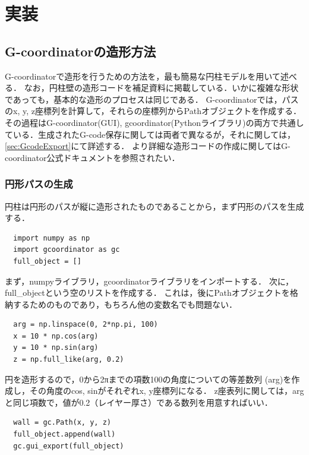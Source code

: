 \documentclass{article}
\begin{document}
\begin{twocolumn}
\begin{itemize}
\end{itemize}


\section{実装}
\subsection{G-coordinatorの造形方法}
G-coordinatorで造形を行うための方法を，最も簡易な円柱モデルを用いて述べる．
なお，円柱壁の造形コードを補足資料に掲載している．いかに複雑な形状であっても，基本的な造形のプロセスは同じである．
G-coordinatorでは，パスのx, y, z座標列を計算して，それらの座標列からPathオブジェクトを作成する．
その過程はG-coordinator(GUI), gcoordinator(Pythonライブラリ)の両方で共通している．生成されたG-code保存に関しては両者で異なるが，それに関しては，\ref{sec:GcodeExport}にて詳述する．
より詳細な造形コードの作成に関してはG-coordinator公式ドキュメント\cite{gcoordinator}を参照されたい．
\subsubsection{円形パスの生成}
円柱は円形のパスが縦に造形されたものであることから，まず円形のパスを生成する．

\begin{lstlisting}
  import numpy as np
  import gcoordinator as gc
  full_object = []
\end{lstlisting}

まず，numpyライブラリ，gcoordinatorライブラリをインポートする．
次に，full\_objectという空のリストを作成する．
これは，後にPathオブジェクトを格納するためのものであり，もちろん他の変数名でも問題ない．

\begin{lstlisting}
  arg = np.linspace(0, 2*np.pi, 100)
  x = 10 * np.cos(arg)
  y = 10 * np.sin(arg)
  z = np.full_like(arg, 0.2)
\end{lstlisting}

円を造形するので，0から2πまでの項数100の角度についての等差数列
(arg)を作成し，その角度のcos, sinがそれぞれx, y座標列になる．
z座表列に関しては，argと同じ項数で，値が0.2（レイヤー厚さ）である数列を用意すればいい．

\begin{lstlisting}
  wall = gc.Path(x, y, z)
  full_object.append(wall)
  gc.gui_export(full_object)
\end{lstlisting}


\end{twocolumn}
\end{document}
